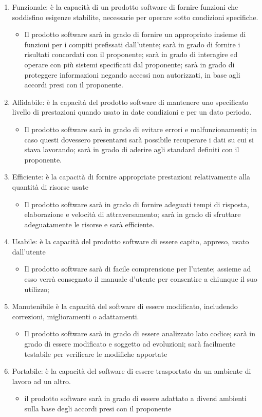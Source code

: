 \documentclass[../piano_di_qualifica.tex]{subfiles}
\begin{document}
\begin{enumerate}
\item Funzionale: è la capacità di un prodotto software di fornire funzioni che soddisfino esigenze stabilite, necessarie per operare sotto condizioni specifiche.
	\begin{itemize}
	\item Il prodotto software sarà in grado di fornire un appropriato insieme di funzioni per i compiti prefissati dall’utente; sarà in grado di fornire i risultati concordati con il proponente; sarà in grado di interagire ed operare con più sistemi specificati dal proponente; sarà in grado di proteggere informazioni negando accessi non autorizzati, in base agli accordi presi con il proponente.
	\end{itemize}
\item Affidabile: è la capacità del prodotto software di mantenere uno specificato livello di prestazioni quando usato in date condizioni e per un dato periodo.
	\begin{itemize}
	\item Il prodotto software sarà in grado di evitare errori e malfunzionamenti; in caso questi dovessero presentarsi sarà possibile recuperare i dati su cui si stava lavorando; sarà in grado di aderire agli standard definiti con il proponente.
	\end{itemize}
\item Efficiente: è la capacità di fornire appropriate prestazioni relativamente alla quantità di risorse usate
	\begin{itemize}
	\item Il prodotto software sarà in grado di fornire adeguati tempi di risposta, elaborazione e velocità di attraversamento; sarà in grado di sfruttare adeguatamente le risorse e sarà efficiente.
	\end{itemize}
\item Usabile: è la capacità del prodotto software di essere capito, appreso, usato dall'utente
	\begin{itemize}
	\item Il prodotto software sarà di facile comprensione per l’utente; assieme ad esso verrà consegnato il manuale d’utente per consentire a chiunque il suo utilizzo; 
	\end{itemize}
\item Manutenibile è la capacità del software di essere modificato, includendo correzioni, miglioramenti o adattamenti.
	\begin{itemize}
	\item Il prodotto software sarà in grado di essere analizzato lato codice; sarà in grado di essere modificato e soggetto ad evoluzioni; sarà facilmente testabile per verificare le modifiche apportate
	\end{itemize}
\item Portabile: è la capacità del software di essere trasportato da un ambiente di lavoro ad un altro.
	\begin{itemize}
	\item il prodotto software sarà in grado di essere adattato a diversi ambienti sulla base degli accordi presi con il proponente
	\end{itemize}
\end{enumerate}
\end{document}
